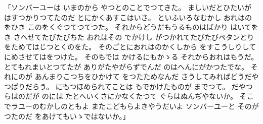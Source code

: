 \documentclass[a4paper,
tate,
book]
{jlreq}
\begin{document}
「ソンバーユーは
いまのから
やつとのことでつてきた。
ましいだとひたいが
はすつかりつてたのだ
とにかくあすこはいさ。
といふいろなむかし
おれはのをひき
このをくぐつてつてつた。
それからどうだもうるものはばかり
はいてをき
さへせてたびたびちた
おれはその でかけし
がつかれてたびたびペタンとり
をためてはじつとくのをた。
そのごとにおれはのかくしから
をすこうしりして
にめさせてはをつけた。
そのもでは
かけるにもかゝる
それからおれはもうだ。
とてもれまいとつてたが
ありがたやがらずでんだ
のはへんにがかつたでな。
それにのが
あんまりこつちをひかけて
をつたためなんだ
さうしてみればどうだやつぱりだらう。
にもつほめられてことは
もでかけたものが
までつて。
だやつらはのだが
のには
たとへいくさにかなくたつて
ぐらはぬんぢやないか。
そこでラユーのむかしのともよ
またこどもらよきやうだいよ
ソンバーユーと
そのがつたのだ
をあけてもいゝではないか。」
 
\end{document}
